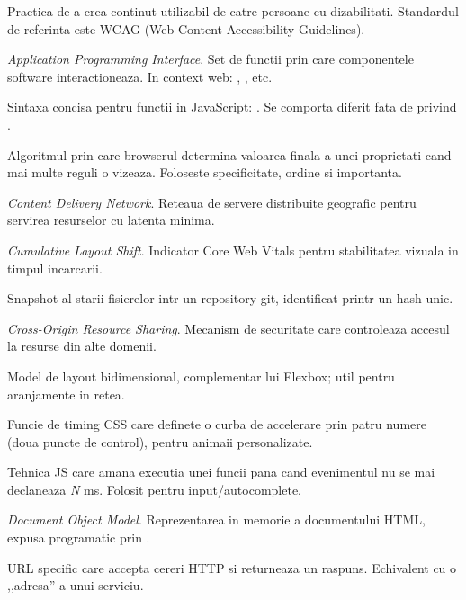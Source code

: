 \begin{description}[font=\sffamily\bfseries\color{partcolor}, leftmargin=0pt, labelindent=0pt, style=nextline, itemsep=4pt]
  \item[Accesibilitate (a11y)] Practica de a crea continut utilizabil de catre persoane cu dizabilitati. Standardul de referinta este WCAG (Web Content Accessibility Guidelines).
  \item[API] \emph{Application Programming Interface}. Set de functii prin care componentele software interactioneaza. In context web: , , etc.
  \item[Arrow function] Sintaxa concisa pentru functii in JavaScript: . Se comporta diferit fata de  privind .
  \item[Cascade (CSS)] Algoritmul prin care browserul determina valoarea finala a unei proprietati cand mai multe reguli o vizeaza. Foloseste specificitate, ordine si importanta.
  \item[CDN] \emph{Content Delivery Network}. Reteaua de servere distribuite geografic pentru servirea resurselor cu latenta minima.
  \item[CLS] \emph{Cumulative Layout Shift}. Indicator Core Web Vitals pentru stabilitatea vizuala in timpul incarcarii.
  \item[Commit] Snapshot al starii fisierelor intr-un repository git, identificat printr-un hash unic.
  \item[CORS] \emph{Cross-Origin Resource Sharing}. Mecanism de securitate care controleaza accesul la resurse din alte domenii.
  \item[CSS Grid] Model de layout bidimensional, complementar lui Flexbox; util pentru aranjamente in retea.
  \item[Cubic-bezier] Funcie de timing CSS care definete o curba de accelerare prin patru numere (doua puncte de control), pentru animaii personalizate.
  \item[Debounce] Tehnica JS care amana executia unei funcii pana cand evenimentul nu se mai declaneaza \emph{N} ms. Folosit pentru input/autocomplete.
  \item[DOM] \emph{Document Object Model}. Reprezentarea in memorie a documentului HTML, expusa programatic prin .
  \item[Endpoint] URL specific care accepta cereri HTTP si returneaza un raspuns. Echivalent cu o ,,adresa'' a unui serviciu.

\end{description}
